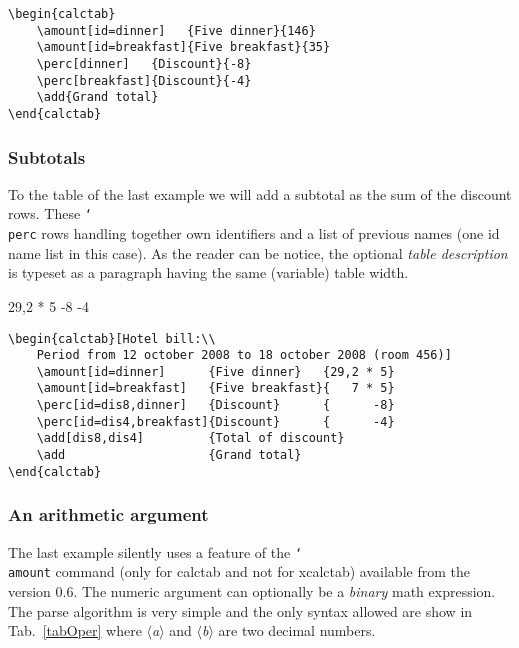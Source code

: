 \documentclass[a4paper]{article}
\newcommand{\env}[1]{\textsf{#1}}
\newcommand{\cmd}[1]{\texttt{\char`\\#1}}
\newcommand{\meta}[1]{\ensuremath{\langle}\emph{#1}\ensuremath{\rangle}}
\begin{document}
\medskip
\begin{Verbatim}
\begin{calctab}
    \amount[id=dinner]   {Five dinner}{146}
    \amount[id=breakfast]{Five breakfast}{35}
    \perc[dinner]   {Discount}{-8}
    \perc[breakfast]{Discount}{-4}
    \add{Grand total}
\end{calctab}
\end{Verbatim}

\subsubsection{Subtotals}
To the table of the last example we will add a subtotal as the sum of the discount rows. These \cmd{perc} rows handling together own identifiers and a list of previous names (one id name list in this case). As the reader can be notice, the optional \emph{table description} is typeset as a paragraph having the same (variable) table width.

\begin{calctab}
       {29,2 * 5}
          {      -8}
          {      -4}
\end{calctab}

\bigskip

\begin{Verbatim}
\begin{calctab}[Hotel bill:\\
    Period from 12 october 2008 to 18 october 2008 (room 456)]
    \amount[id=dinner]      {Five dinner}   {29,2 * 5}
    \amount[id=breakfast]   {Five breakfast}{   7 * 5}
    \perc[id=dis8,dinner]   {Discount}      {      -8}
    \perc[id=dis4,breakfast]{Discount}      {      -4}
    \add[dis8,dis4]         {Total of discount}
    \add                    {Grand total}
\end{calctab}
\end{Verbatim}

%
%
%
\subsubsection{An arithmetic argument}
The last example silently uses a feature of the \cmd{amount} command (only for \env{calctab} and not for \env{xcalctab}) available from the version 0.6. The numeric argument can optionally be a \emph{binary} math expression. The parse algorithm is very simple and the only syntax allowed are show in Tab.~\ref{tabOper} where \meta{a} and \meta{b} are two decimal numbers.
\end{document}
